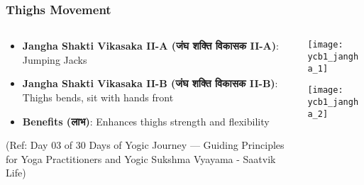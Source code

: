 \begin{frame}[fragile]\frametitle{Thighs Movement}
\begin{columns}
    \begin{column}[T]{0.5\linewidth}
      \begin{itemize}
		\item \textbf{Jangha Shakti Vikasaka II-A (जंघ शक्ति विकासक II-A)}: Jumping Jacks
		\item \textbf{Jangha Shakti Vikasaka II-B (जंघ शक्ति विकासक II-B)}: Thighs bends, sit with hands front
		\item \textbf{Benefits (लाभ)}: Enhances thighs strength and flexibility
	  \end{itemize}
	  
		{\tiny (Ref: Day 03 of 30 Days of Yogic Journey — Guiding Principles for Yoga Practitioners and Yogic Sukshma Vyayama - Saatvik Life)}		  
    \end{column}
    \begin{column}[T]{0.5\linewidth}
		\begin{center}
		\texttt{[image: ycb1\_jangha\_1]}
		
		\texttt{[image: ycb1\_jangha\_2]}


		\end{center}	
    \end{column}
\end{columns}
\end{frame}


